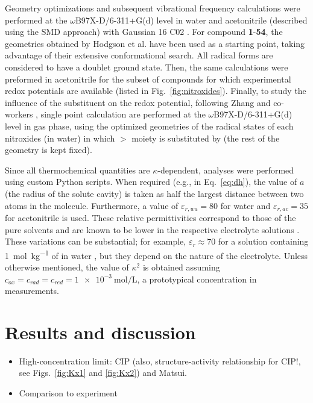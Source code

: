 \documentclass[review]{elsarticle}
\begin{document}
Geometry optimizations and subsequent vibrational frequency calculations were performed at the $\omega$B97X-D/6-311+G(d) level in water and acetonitrile (described using the SMD \cite{marenichUniversalSolvationModel2009} approach) with Gaussian 16 C02 \cite{g16}. For compound \textbf{1}-\textbf{54}, the geometries obtained by Hodgson et al. \cite{hodgsonOneElectronOxidationReduction2007} have been used as a starting point, taking advantage of their extensive conformational search. All radical forms are considered to have a doublet ground state. Then, the same calculations were preformed in acetonitrile for the subset of compounds for which experimental redox potentials are available (listed in Fig.~\ref{fig:nitroxides}). Finally, to study the influence of the substituent on the redox potential, following Zhang and co-workers \cite{zhangEffectHeteroatomFunctionality2018}, single point calculation are performed at the $\omega$B97X-D/6-311+G(d) level in gas phase, using the optimized geometries of  the radical states of each nitroxides (in water) in which $>$ moiety is substituted by  (the rest of the geometry is kept fixed).

Since all thermochemical quantities are $\kappa$-dependent, analyses were performed using custom Python scripts. When required (e.g., in Eq.~\eqref{eq:dh}), the value of $a$ (the radius of the solute cavity) is taken as half the largest distance between two atoms in the molecule. Furthermore, a value of $\varepsilon_{r,wa}=80$ for water and $\varepsilon_{r,ac}=35$ for acetonitrile is used. These relative permittivities correspond to those of the pure solvents and are known to be lower in the respective electrolyte solutions \cite{silvaTrueHuckelEquation2022}. These variations can be substantial; for example, $\varepsilon_r \approx 70$ for a solution containing \SI{1}{\mol\per\kilo\gram} of  in water \cite{kontogeorgisDebyeHuckelTheoryIts2018, silvaTrueHuckelEquation2022}, but they depend on the nature of the electrolyte.
Unless otherwise mentioned, the value of $\kappa^2$ is obtained assuming  $c_{ox} = c_{rad} = c_ {red} = \SI{1e-3}{\mole\per\liter}$, a prototypical concentration in measurements.

\clearpage

\section{Results and discussion}

\begin{itemize}
	\item High-concentration limit: CIP (also, structure-activity relationship for CIP!, see Figs.~\ref{fig:Kx1} and \ref{fig:Kx2}) and Matsui.
	\item Comparison to experiment
\end{itemize}
\end{document}
